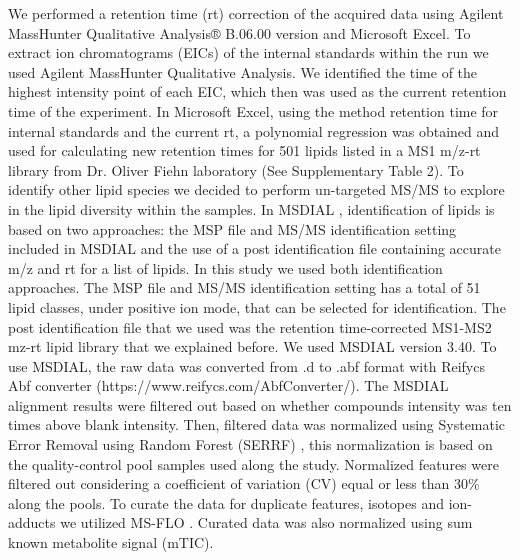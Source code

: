 \documentclass[9pt,twocolumn,twoside]{BioRxiv}
\begin{document}
We performed a retention time (rt) correction of the acquired data using Agilent MassHunter Qualitative Analysis® B.06.00 version and Microsoft Excel. 
To extract ion chromatograms (EICs) of the internal standards within the run we used Agilent MassHunter Qualitative Analysis.
We identified the time of the highest intensity point of each EIC, which then was used as the current retention time of the experiment. 
In Microsoft Excel, using the method retention time for internal standards and the current rt, a polynomial regression was obtained and used for calculating new retention times for 501 lipids listed in a MS1 m/z-rt library from Dr. Oliver Fiehn laboratory (See Supplementary Table 2). 
To identify other lipid species we decided to perform un-targeted MS/MS to explore in the lipid diversity within the samples. 
In MSDIAL \cite{Tsugawa2015-kh}, identification of lipids is based on two approaches: the MSP file and MS/MS identification setting included in MSDIAL and the use of a post identification file containing accurate m/z and rt for a list of lipids. In this study we used both identification approaches. 
The MSP file and MS/MS identification setting has a total of 51 lipid classes, under positive ion mode, that can be selected for identification. 
The post identification file that we used was the retention time-corrected MS1-MS2 mz-rt lipid library that we explained before. 
We used MSDIAL \cite{Tsugawa2015-kh} version 3.40. To use MSDIAL, the raw data was converted from .d to .abf format with Reifycs Abf converter (https://www.reifycs.com/AbfConverter/). 
The MSDIAL alignment results were filtered out based on whether compounds intensity was ten times above blank intensity. 
Then, filtered data was normalized using Systematic Error Removal using Random Forest (SERRF) \cite{Fan2019}, this normalization is based on the quality-control pool samples used along the study. Normalized features were filtered out considering a coefficient of variation (CV) equal or less than 30\% along the pools. 
To curate the data for duplicate features, isotopes and ion-adducts we utilized MS-FLO \cite{DeFelice2017-ms}.
Curated data was also normalized using sum known metabolite signal (mTIC).
\end{document}
